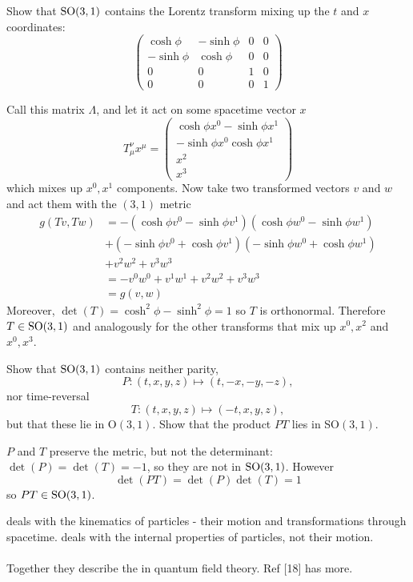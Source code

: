 \documentclass[10pt]{article}
\begin{document}
\begin{example}\label{b2e1}
	Show that $\text{SO}(3,1)$ contains the Lorentz transform mixing up the $t$ and $x$ coordinates:
	$$
	\begin{pmatrix}
		\cosh\phi&-\sinh\phi&0&0\\
		-\sinh\phi&\cosh\phi&0&0\\
		0&0&1&0\\
		0&0&0&1
	\end{pmatrix}
	$$
\end{example}
\sol Call this matrix $\Lambda$, and let it act on some spacetime vector $x$
$$
T_\mu^\nu x^\mu = \begin{pmatrix}
	\cosh\phi x^0 -\sinh\phi x^1\\
	-\sinh\phi x^0 \cosh\phi x^1\\
	x^2\\
	x^3
\end{pmatrix}
$$
which mixes up $x^0, x^1$ components. Now take two transformed vectors $v$ and $w$ and act them with the $(3,1)$ metric
$$
\begin{aligned}
	g(Tv, Tw) &= -(\cosh\phi v^0 -\sinh\phi v^1)(\cosh\phi w^0 -\sinh\phi w^1)\\
	&+ (-\sinh\phi v^0 +\cosh\phi v^1)(-\sinh\phi w^0 +\cosh\phi w^1)\\
	&+ v^2w^2 + v^3w^3\\
	&= -v^0w^0 + v^1w^1+v^2w^2 + v^3w^3\\
	&= g(v,w)
\end{aligned}
$$
Moreover, $\det (T) = \cosh^2\phi -\sinh^2\phi = 1$ so $T$ is orthonormal. Therefore $T \in \text{SO}(3,1)$ and analogously for the other transforms that mix up $x^0, x^2$ and $x^0, x^3$.


\begin{example}
	Show that $\text{SO}(3,1)$ contains neither parity,
	$$
	P:(t,x,y,z)\mapsto(t,-x,-y,-z),
	$$
	nor time-reversal
	$$
	T:(t,x,y,z)\mapsto(-t,x,y,z),
	$$
	but that these lie in O$(3,1)$. Show that the product $PT$ lies in SO$(3, 1)$.
\end{example}
\sol $P$ and $T$ preserve the metric, but not the determinant: $\det (P) = \det (T) = -1$, so they are not in $\text{SO}(3,1)$. However
$$
\det (PT) = \det (P) \det (T) = 1
$$
so $PT \in \text{SO}(3,1)$.

\begin{definition}
	 deals with the kinematics of particles - their motion and transformations through spacetime.  deals with the internal properties of particles, not their motion.\\\\
	Together they describe the  in quantum field theory. Ref [18] has more.
\end{definition}
\end{document}
